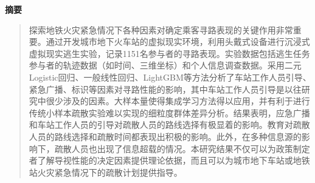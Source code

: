\noindent\textbf{摘要}\par
\begin{quote}\small
探索地铁火灾紧急情况下各种因素对确定乘客寻路表现的关键作用非常重要。通过开发城市地下火车站的虚拟现实环境，利用头戴式设备进行沉浸式虚拟现实逃生实验，记录1151名参与者的寻路表现。实验数据包括逃生任务参与者的轨迹数据（如时间、三维坐标）和个人信息调查数据。采用二元Logistic回归、一般线性回归、LightGBM等方法分析了车站工作人员引导、紧急广播、标识等因素对寻路性能的影响，其中车站工作人员引导是以往研究中很少涉及的因素。大样本量使得集成学习方法得以应用，并有利于进行传统小样本疏散实验难以实现的细粒度群体差异分析。结果表明，应急广播和车站工作人员的引导对疏散人员的路线选择有极显着的影响。教育对疏散人员的路线选择和疏散时间都表现出积极的影响。此外，在多种信息源的影响下，疏散人员也出现了信息超载的情况。本研究结果不仅可以为政策制定者了解导视性能的决定因素提供理论依据，而且可以为城市地下车站或地铁站火灾紧急情况下的疏散计划提供指导。
\end{quote}

\vspace{0.5em}
